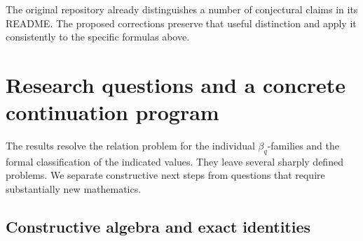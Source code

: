 \documentclass[11pt]{article}
\numberwithin{equation}{section}
\theoremstyle{definition}
\theoremstyle{remark}
\begin{document}
The original repository already distinguishes a number of conjectural
claims in its README. The proposed corrections preserve that useful
distinction and apply it consistently to the specific formulas above.

\section{Research questions and a concrete continuation program}
\label{sec:questions}

The results resolve the relation problem for the individual
$\beta_q$-families and the formal classification of the indicated
values. They leave several sharply defined problems. We separate
constructive next steps from questions that require substantially
new mathematics.

\subsection{Constructive algebra and exact identities}
\end{document}
